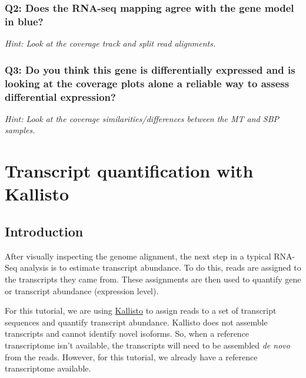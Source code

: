 \documentclass[11pt]{article}
\begin{document}
\hypertarget{q2-does-the-rna-seq-mapping-agree-with-the-gene-model-in-blue}{%
\subsubsection{Q2: Does the RNA-seq mapping agree with the gene model in
blue?}\label{q2-does-the-rna-seq-mapping-agree-with-the-gene-model-in-blue}}

\textit{Hint: Look at the coverage track and split read alignments.}

\hypertarget{q3-do-you-think-this-gene-is-differentially-expressed-and-is-looking-at-the-coverage-plots-alone-a-reliable-way-to-assess-differential-expression}{%
\subsubsection{Q3: Do you think this gene is differentially expressed
and is looking at the coverage plots alone a reliable way to assess
differential
expression?}\label{q3-do-you-think-this-gene-is-differentially-expressed-and-is-looking-at-the-coverage-plots-alone-a-reliable-way-to-assess-differential-expression}}

\textit{Hint: Look at the coverage similarities/differences between the MT
and SBP samples.}




\newpage





    \hypertarget{transcript-quantification-with-kallisto}{%
\section{Transcript quantification with
Kallisto}\label{transcript-quantification-with-kallisto}}

    \hypertarget{introduction}{%
\subsection{Introduction}\label{introduction}}

After visually inspecting the genome alignment, the next step in a
typical RNA-Seq analysis is to estimate transcript abundance. To do
this, reads are assigned to the transcripts they came from. These
assignments are then used to quantify gene or transcript abundance
(expression level).

For this tutorial, we are using
\href{https://pachterlab.github.io/kallisto/}{Kallisto} to assign reads
to a set of transcript sequences and quantify transcript abundance.
Kallisto does not assemble transcripts and cannot identify novel
isoforms. So, when a reference transcriptome isn't available, the
transcripts will need to be assembled \textit{de novo} from the reads.
However, for this tutorial, we already have a reference transcriptome
available.
\end{document}
